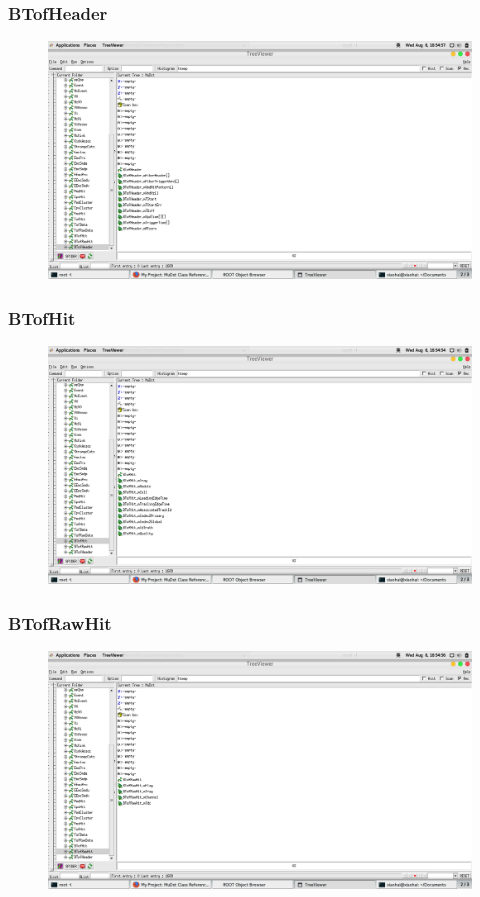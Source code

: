 \documentclass[10pt]{beamer}
\begin{document}
\label{BTofHeader}
\begin{frame}
  \frametitle{BTofHeader}
  \begin{figure}[hbtp]
    \centering
    \includegraphics[width=\textwidth]{BTofHeader.png}
  \end{figure}
\end{frame}
\label{BTofHit}
\begin{frame}
  \frametitle{BTofHit}
  \begin{figure}[hbtp]
    \centering
    \includegraphics[width=\textwidth]{BTofHit.png}
  \end{figure}
\end{frame}
\label{BTofRawHit}
\begin{frame}
  \frametitle{BTofRawHit}
  \begin{figure}[hbtp]
    \centering
    \includegraphics[width=\textwidth]{BTofRawHit.png}
  \end{figure}
\end{frame}
\end{document}
